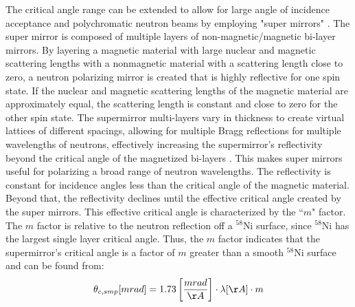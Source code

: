 The critical angle range can be extended to allow for large angle of incidence acceptance and polychromatic neutron beams by employing "super mirrors" \cite{Mezei1976, Mezei1977}. The super mirror is composed of multiple layers of non-magnetic/magnetic bi-layer mirrors. By layering a magnetic material with large nuclear and magnetic scattering lengths with a nonmagnetic material with a scattering length close to zero, a neutron polarizing mirror is created that is highly reflective for one spin state. If the nuclear and magnetic scattering lengths of the magnetic material are approximately equal, the scattering length is constant and close to zero for the other spin state. The supermirror multi-layers vary in thickness to create virtual lattices of different spacings, allowing for multiple Bragg reflections for multiple wavelengths of neutrons, effectively increasing the supermirror’s reflectivity beyond the critical angle of the magnetized bi-layers \cite{Mezei1976, Mezei1977}. This makes super mirrors useful for polarizing a broad range of neutron wavelengths. The reflectivity is constant for incidence angles less than the critical angle of the magnetic material. Beyond that, the reflectivity declines until the effective critical angle created by the super mirrors. This effective critical angle is characterized by the ``$m$" factor. The $m$ factor is relative to the neutron reflection off a $^{58}$Ni surface, since $^{58}$Ni has the largest single layer critical angle. Thus, the $m$ factor indicates that the supermirror’s critical angle is a factor of $m$ greater than a smooth $^{58}$Ni surface and can be found from:
\begin{equation}
   \theta_{c,smp}[mrad] =1.73 \left[\frac{mrad}{\AA} \right] \cdot \lambda [\AA] \cdot m 
\end{equation}
 
